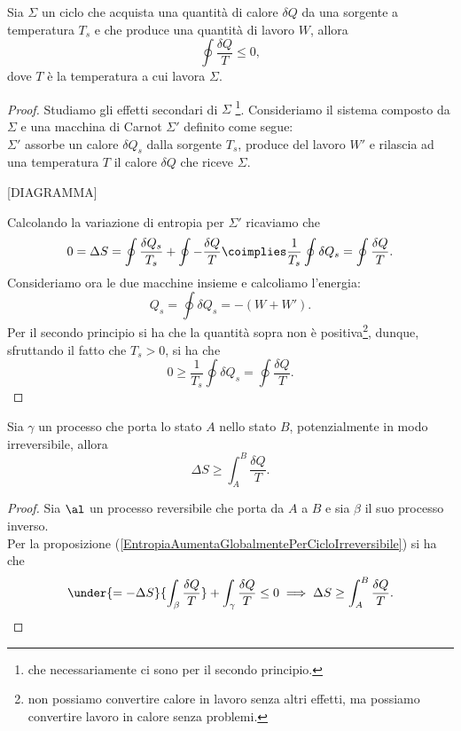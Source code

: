 \begin{proposition}\label{EntropiaAumentaGlobalmentePerCicloIrreversibile}
Sia $\Sigma$ un ciclo che acquista una quantit\`a di calore $\delta Q$ da una sorgente a temperatura $T_s$ e che produce una quantit\`a di lavoro $W$, allora \[\oint \frac{\delta Q}T\leq 0,\]
dove $T$ \`e la temperatura a cui lavora $\Sigma$.
\end{proposition}
\begin{proof}
Studiamo gli effetti secondari di $\Sigma$ \footnote{che necessariamente ci sono per il secondo principio.}.
Consideriamo il sistema composto da $\Sigma$ e una macchina di Carnot $\Sigma'$ definito come segue:\\
$\Sigma'$ assorbe un calore $\delta Q_s$ dalla sorgente $T_s$, produce del lavoro $W'$ e rilascia ad una temperatura $T$ il calore $\delta Q$ che riceve $\Sigma$.


[DIAGRAMMA]

\noindent Calcolando la variazione di entropia per $\Sigma'$ ricaviamo che
\[0=\Delta S=\oint \frac{\delta Q_s}{T_s}+\oint -\frac{\delta Q}T\coimplies \frac1{T_s}\oint \delta Q_s=\oint \frac{\delta Q}T.\]
Consideriamo ora le due macchine insieme e calcoliamo l'energia:
\[Q_s=\oint \delta Q_s=-(W+W').\]
Per il secondo principio si ha che la quantit\`a sopra non \`e positiva\footnote{non possiamo convertire calore in lavoro senza altri effetti, ma possiamo convertire lavoro in calore senza problemi.}, dunque, sfruttando il fatto che $T_s>0$, si ha che
\[0\geq \frac1{T_s}\oint \delta Q_s=\oint \frac{\delta Q}T.\]
\end{proof}



\begin{theorem}\label{VariazioneEntropiaSuperaIntegrale}
Sia $\gamma$ un processo che porta lo stato $A$ nello stato $B$, potenzialmente in modo irreversibile, allora
\[\Delta S\geq \int_A^B\frac{\delta Q}T.\]
\end{theorem}
\begin{proof}
Sia $\al$ un processo reversibile che porta da $A$ a $B$ e sia $\beta$ il suo processo inverso.\\
Per la proposizione (\ref{EntropiaAumentaGlobalmentePerCicloIrreversibile}) si ha che
\[\under{=-\Delta S}{\int_\beta\frac{\delta Q}T}+\int_\gamma\frac{\delta Q}T\leq 0\implies \Delta S\geq \int_A^B\frac{\delta Q}T.\]
\end{proof}


